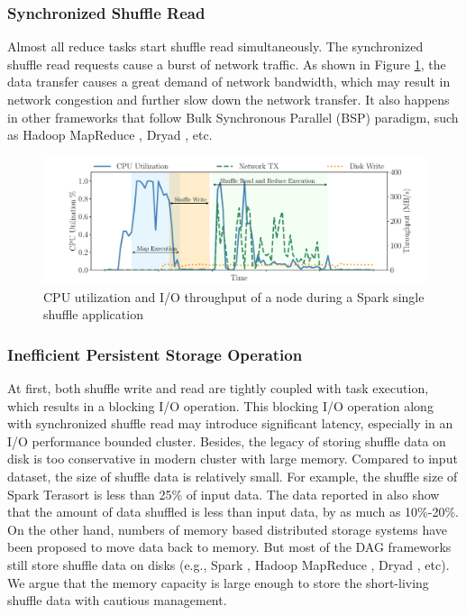 \subsubsection{Synchronized Shuffle Read}
Almost all reduce tasks start shuffle read simultaneously. 
The synchronized shuffle read requests cause a burst of network traffic. 
As shown in Figure \ref{fig:util}, 
the data transfer causes a great demand of network bandwidth, which may result in network congestion and further slow down the network transfer.
It also happens in other frameworks that follow Bulk Synchronous Parallel (BSP) paradigm, such as Hadoop MapReduce \cite{hadoop}, Dryad \cite{dryad}, etc.

\begin{figure}
	\includegraphics[width=\linewidth]{fig/util}
	\caption{CPU utilization and I/O throughput of a node during a Spark single shuffle application}
	\label{fig:util}
	\vspace{-1em}
\end{figure}

\subsubsection{Inefficient Persistent Storage Operation}
At first, both shuffle write and read are tightly coupled with task execution, which results in a blocking I/O operation. 
This blocking I/O operation along with synchronized shuffle read may introduce significant latency, especially in an I/O performance bounded cluster.
Besides, the legacy of storing shuffle data on disk is too conservative in modern cluster with large memory. 
Compared to input dataset, the size of shuffle data is relatively small. 
For example, the shuffle size of Spark Terasort \cite{spark-tera} is less than 25\% of input data. 
The data reported in \cite{makingsense} also show that the amount of data shuffled is less than input data, by as much as 10\%-20\%. 
\ifrevision
{}
\fi
On the other hand, numbers of memory based distributed storage systems have been proposed \cite{memcached, tachyon, ramcloud} to move data back to memory. 
But most of the DAG frameworks still store shuffle data on disks (e.g., Spark \cite{apachespark}, Hadoop MapReduce \cite{hadoop}, Dryad \cite{dryad}, etc).
We argue that the memory capacity is large enough to store the short-living shuffle data with cautious management.

